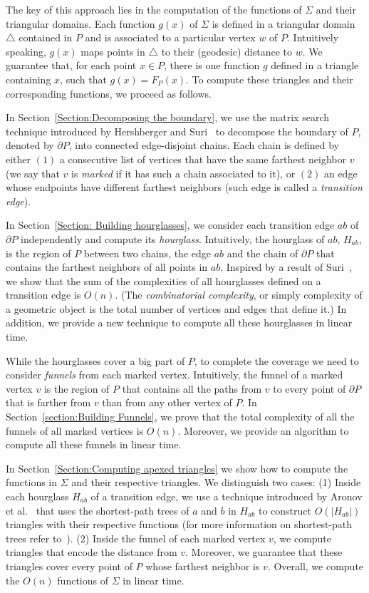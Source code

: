 \documentclass[a4paper]{article}
\newcommand{\F}[2]{\ensuremath{F_{\scriptscriptstyle #1}(#2)}}
\begin{document}
The key of this approach lies in the computation of the functions of $\Sigma$ and their triangular domains. 
Each function $g(x)$ of $\Sigma$ is defined in a triangular domain $\triangle$ contained in $P$ and is associated to a particular vertex $w$ of $P$. 
Intuitively speaking, $g(x)$ maps points in $\triangle$ to their (geodesic) distance to $w$.
We guarantee that, for each point $x\in P$, there is one function $g$ defined in a triangle containing $x$, such that $g(x) = \F{P}{x}$.
To compute these triangles and their corresponding functions, we proceed as follows.

In Section~\ref{Section:Decomposing the boundary}, we use the matrix search technique introduced by Hershberger and Suri~\cite{hershberger1993matrix} to decompose the boundary of $P$, denoted by $\partial P$, into connected edge-disjoint chains.
Each chain is defined by either $(1)$ a consecutive list of vertices that have the same farthest neighbor $v$ (we say that $v$ is \emph{marked} if it has such a chain associated to it), or $(2)$ an edge whose endpoints have different farthest neighbors (such edge is called a \emph{transition edge}).

In Section~\ref{Section: Building hourglasses}, we consider each transition edge $ab$ of $\partial P$ independently and compute its \emph{hourglass}. Intuitively, the hourglass of $ab$, $H_{ab}$, is the region of $P$ between two chains, the edge $ab$ and the chain of $\partial P$ that contains the farthest neighbors of all points in $ab$.
Inspired by a result of Suri~\cite{suri1989computing}, we show that the sum of the complexities of all hourglasses defined on a transition edge is $O(n)$. (The \emph{combinatorial complexity}, or simply complexity of a geometric object is the total number of vertices and edges that define it.)
In addition, we provide a new technique to compute all these hourglasses in linear time.

While the hourglasses cover a big part of $P$, to complete the coverage we need to consider \emph{funnels} from each marked vertex. Intuitively, the funnel of a marked vertex $v$ is the region of $P$ that contains all the paths from $v$ to every point of $\partial P$ that is farther from $v$ than from any other vertex of $P$. In Section~\ref{section:Building Funnels}, we prove that the total complexity of all the funnels of all marked vertices is $O(n)$. Moreover, we provide an algorithm to compute all these funnels in linear time.

In Section~\ref{Section:Computing apexed triangles} we show how to compute the functions in $\Sigma$ and their respective triangles.
We distinguish two cases: (1) Inside each hourglass $H_{ab}$ of a transition edge, we use a technique introduced by Aronov et al.~\cite{aronov1993furthest} that uses the shortest-path trees of $a$ and $b$ in $H_{ab}$ to construct $O(|H_{ab}|)$ triangles with their respective functions (for more information on shortest-path trees refer to~\cite{guibasShortestPathTree}). 
(2) Inside the funnel of each marked vertex $v$, we compute triangles that encode the distance from $v$. Moreover, we guarantee that these triangles cover every point of $P$ whose farthest neighbor is $v$. 
Overall, we compute the $O(n)$ functions of $\Sigma$ in linear time.
\end{document}
